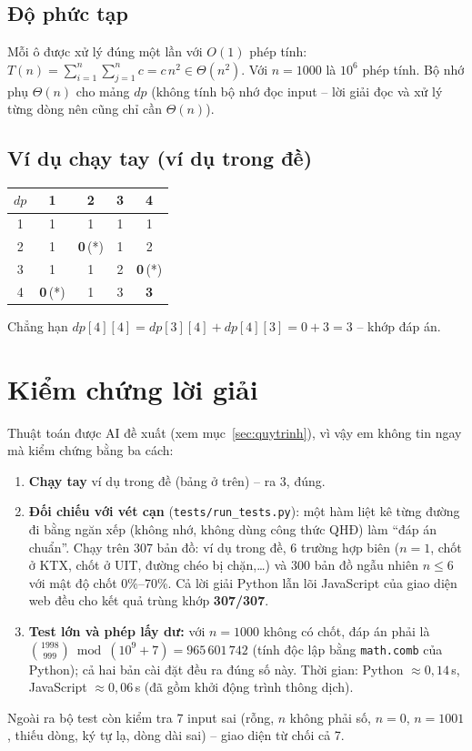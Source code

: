 \documentclass[12pt,a4paper]{article}
\begin{document}
\subsection{Độ phức tạp}
Mỗi ô được xử lý đúng một lần với $O(1)$ phép tính: $T(n) = \sum_{i=1}^{n}\sum_{j=1}^{n} c = c\,n^2 \in \Theta(n^2)$. Với $n=1000$ là $10^6$ phép tính. Bộ nhớ phụ $\Theta(n)$ cho mảng $dp$ (không tính bộ nhớ đọc input -- lời giải đọc và xử lý từng dòng nên cũng chỉ cần $\Theta(n)$).

\subsection{Ví dụ chạy tay (ví dụ trong đề)}
\begin{center}
\begin{tabular}{c|cccc}
$dp$ & 1 & 2 & 3 & 4\\\hline
1 & 1 & 1 & 1 & 1\\
2 & 1 & \textbf{0}\,(*) & 1 & 2\\
3 & 1 & 1 & 2 & \textbf{0}\,(*)\\
4 & \textbf{0}\,(*) & 1 & 3 & \textbf{3}\\
\end{tabular}
\end{center}
Chẳng hạn $dp[4][4] = dp[3][4] + dp[4][3] = 0 + 3 = 3$ -- khớp đáp án.

\section{Kiểm chứng lời giải}
Thuật toán được AI đề xuất (xem mục~\ref{sec:quytrinh}), vì vậy em không tin ngay mà kiểm chứng bằng ba cách:
\begin{enumerate}
  \item \textbf{Chạy tay} ví dụ trong đề (bảng ở trên) -- ra 3, đúng.
  \item \textbf{Đối chiếu với vét cạn} (\texttt{tests/run\_tests.py}): một hàm liệt kê từng đường đi bằng ngăn xếp (không nhớ, không dùng công thức QHĐ) làm ``đáp án chuẩn''. Chạy trên 307 bản đồ: ví dụ trong đề, 6 trường hợp biên ($n=1$, chốt ở KTX, chốt ở UIT, đường chéo bị chặn,\dots) và 300 bản đồ ngẫu nhiên $n\le 6$ với mật độ chốt 0\%--70\%. Cả lời giải Python lẫn lõi JavaScript của giao diện web đều cho kết quả trùng khớp \textbf{307/307}.
  \item \textbf{Test lớn và phép lấy dư:} với $n=1000$ không có chốt, đáp án phải là $\binom{1998}{999} \bmod (10^9+7) = 965\,601\,742$ (tính độc lập bằng \texttt{math.comb} của Python); cả hai bản cài đặt đều ra đúng số này. Thời gian: Python $\approx 0{,}14$\,s, JavaScript $\approx 0{,}06$\,s (đã gồm khởi động trình thông dịch).
\end{enumerate}
Ngoài ra bộ test còn kiểm tra 7 input sai (rỗng, $n$ không phải số, $n=0$, $n=1001$, thiếu dòng, ký tự lạ, dòng dài sai) -- giao diện từ chối cả 7.
\end{document}
